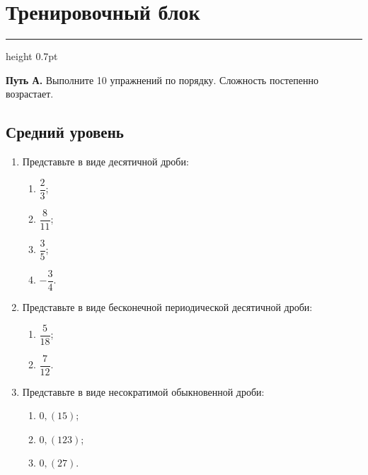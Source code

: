 \documentclass[a4paper,12pt]{article}
\newcommand{\ruleline}{%
    \par\medskip
    {\color{accent}\hrule height 0.7pt}
    \medskip
}
\begin{document}

\newpage

\section*{\textcolor{darkaccent}{Тренировочный блок}}

\ruleline

\textbf{Путь А.}
Выполните 10 упражнений по порядку.
Сложность постепенно возрастает.

\subsection*{\textcolor{darkaccent}{Средний уровень}}

\begin{enumerate}

\item
Представьте в виде десятичной дроби:

\begin{enumerate}[label=\arabic*)]
    \item \(\dfrac23\);
    \item \(\dfrac8{11}\);
    \item \(\dfrac35\);
    \item \(-\dfrac34\).
\end{enumerate}

\item
Представьте в виде бесконечной периодической десятичной дроби:

\begin{enumerate}[label=\arabic*)]
    \item \(\dfrac5{18}\);
    \item \(\dfrac7{12}\).
\end{enumerate}

\item
Представьте в виде несократимой обыкновенной дроби:

\begin{enumerate}[label=\arabic*)]
    \item \(0{,}(15)\);
    \item \(0{,}(123)\);
    \item \(0{,}(27)\).
\end{enumerate}

\end{enumerate}
\end{document}
